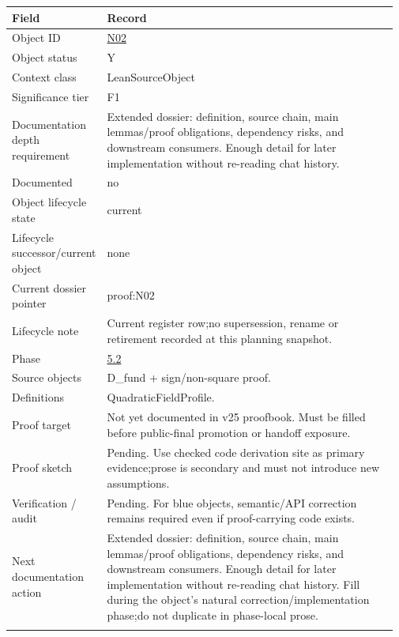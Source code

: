 \begin{longtable}{L{0.16\linewidth} L{0.81\linewidth}}
\hline
\textbf{Field} & \textbf{Record}\\
\hline
Object ID & \hyperlink{object-row-N02}{N02}\\
\hline\addlinespace[0.20em]
Object status & Y\\
\hline\addlinespace[0.20em]
Context class & LeanSourceObject\\
\hline\addlinespace[0.20em]
Significance tier & F1\\
\hline\addlinespace[0.20em]
Documentation depth requirement & Extended dossier: definition, source chain, main lemmas/\allowbreak{}proof obligations, dependency risks, and downstream consumers. Enough detail for later implementation without re-reading chat history.\\
\hline\addlinespace[0.20em]
Documented & no\\
\hline\addlinespace[0.20em]
Object lifecycle state & current\\
\hline\addlinespace[0.20em]
Lifecycle successor/\allowbreak{}current object & none\\
\hline\addlinespace[0.20em]
Current dossier pointer & proof:N02\\
\hline\addlinespace[0.20em]
Lifecycle note & Current register row;\newline no supersession, rename or retirement recorded at this planning snapshot.\\
\hline\addlinespace[0.20em]
Phase & \hyperlink{phase-row-5-2}{5.2}\\
\hline\addlinespace[0.20em]
Source objects & D\_fund + sign/\allowbreak{}non-square proof.\\
\hline\addlinespace[0.20em]
Definitions & QuadraticFieldProfile.\\
\hline\addlinespace[0.20em]
Proof target & Not yet documented in v25 proofbook. Must be filled before public-final promotion or handoff exposure.\\
\hline\addlinespace[0.20em]
Proof sketch & Pending. Use checked code derivation site as primary evidence;\newline prose is secondary and must not introduce new assumptions.\\
\hline\addlinespace[0.20em]
Verification /\allowbreak{} audit & Pending. For blue objects, semantic/\allowbreak{}API correction remains required even if proof-carrying code exists.\\
\hline\addlinespace[0.20em]
Next documentation action & Extended dossier: definition, source chain, main lemmas/\allowbreak{}proof obligations, dependency risks, and downstream consumers. Enough detail for later implementation without re-reading chat history. Fill during the object's natural correction/\allowbreak{}implementation phase;\newline do not duplicate in phase-local prose.\\
\hline\addlinespace[0.20em]
\end{longtable}
